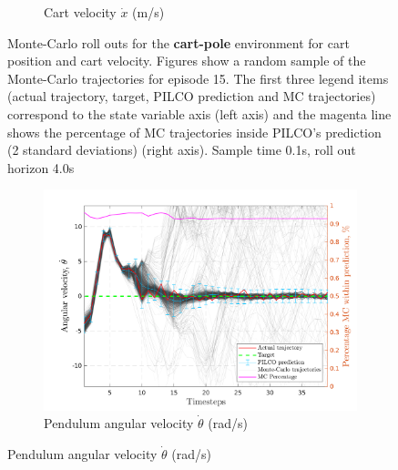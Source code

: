 \begin{figure}[H]
\begin{subfigure}[b]{1\linewidth}
    \caption{Cart velocity $\dot x$ (m/s)} 
    \label{Fig:Re-cp-cart-velocity} 
  \end{subfigure} 
\caption[Monte-Carlo roll outs for \textbf{cart-pole} cart position and cart velocity]{Monte-Carlo roll outs for the \textbf{cart-pole} environment for cart position and cart velocity. Figures show a random sample of the Monte-Carlo trajectories for episode 15. The first three legend items (actual trajectory, target, PILCO prediction and MC trajectories) correspond to the state variable axis (left axis) and the magenta line shows the percentage of MC trajectories inside PILCO's prediction (2 standard deviations) (right axis). Sample time 0.1s, roll out horizon 4.0s}
\label{Fig:Re-cp-MC-roll-outs-1} 
\end{figure}
 
 
\begin{figure}[H]    
  \begin{subfigure}[b]{1\linewidth}
    \centering
    \includegraphics[height=0.4\textheight,width=1\textwidth]{Chapter3/Figures/cp_MC_rollout_Ep_15_Dim_3.png} 
    \caption{Pendulum angular velocity $\dot \theta$ (rad/s)} 
    \label{Fig:Re-cp-pen-velocity} 
  \end{subfigure} 


\end{figure}

